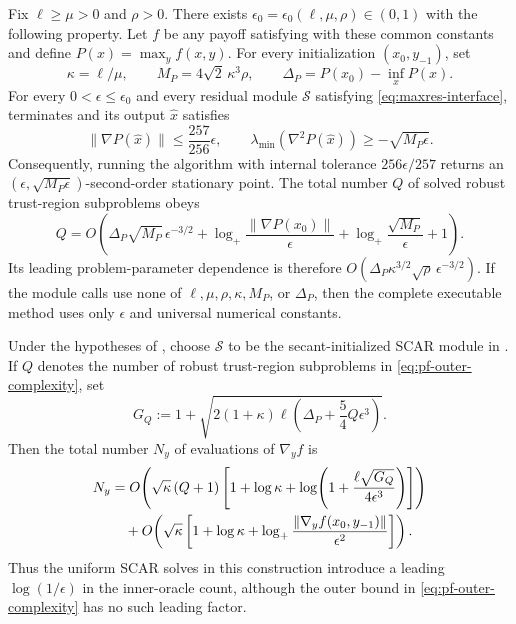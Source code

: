 \documentclass{article}
\begin{document}
\begin{theorem}
\label{thm:pf-scar-utr}
Fix $\ell\ge\mu>0$ and $\rho>0$.  There exists
$\epsilon_0=\epsilon_0(\ell,\mu,\rho)\in(0,1)$ with the following
property.  Let $f$ be any payoff satisfying  with
these common constants and define $P(x)=\max_yf(x,y)$.  For every
initialization $(x_0,y_{-1})$, set
\[
 \kappa=\ell/\mu,
 \qquad M_P=4\sqrt2\,\kappa^3\rho,
 \qquad \Delta_P=P(x_0)-\inf_xP(x).
\]
For every $0<\epsilon\le\epsilon_0$ and every residual module $\mathcal S$
satisfying \eqref{eq:maxres-interface},
 terminates and its output $\widehat x$
satisfies
\begin{equation}\label{eq:pf-return}
 \|\nabla P(\widehat x)\|\le\frac{257}{256}\epsilon,
 \qquad
 \lambda_{\min}(\nabla^2P(\widehat x))
 \ge-\sqrt{M_P\epsilon}.
\end{equation}
Consequently, running the algorithm with internal tolerance
$256\epsilon/257$ returns an
$(\epsilon,\sqrt{M_P\epsilon})$-second-order stationary point.
The total number $Q$ of solved robust trust-region subproblems obeys
\begin{equation}\label{eq:pf-outer-complexity}
 Q=O\!\left(
  \Delta_P\sqrt{M_P}\,\epsilon^{-3/2}
  +\log_+\frac{\|\nabla P(x_0)\|}{\epsilon}
  +\log_+\frac{\sqrt{M_P}}{\epsilon}+1
 \right).
\end{equation}
Its leading problem-parameter dependence is therefore
$O(\Delta_P\kappa^{3/2}\sqrt\rho\,\epsilon^{-3/2})$.
If the module calls use none of
$\ell,\mu,\rho,\kappa,M_P$, or $\Delta_P$, then the complete
executable method uses only $\epsilon$ and universal numerical
constants.
\end{theorem}

\begin{corollary}
\label{cor:pf-scar-inner-complexity}
Under the hypotheses of , choose $\mathcal S$ to
be the secant-initialized SCAR module in .  If
$Q$ denotes the number of robust trust-region subproblems in
\eqref{eq:pf-outer-complexity}, set
\begin{equation}\label{eq:pf-gradient-level}
 G_Q:=1+\sqrt{2(1+\kappa)\ell
       \left(\Delta_P+\frac54Q\epsilon^3\right)}.
\end{equation}
Then the total number $N_y$ of
evaluations of $\nabla_yf$ is
\begin{align}
 N_y
 &=O\!\left(
  \sqrt\kappa\,(Q+1)
  \left[1+\log\kappa+
   \log\!\left(1+
    \frac{\ell\sqrt{G_Q}}{4\epsilon^3}
   \right)
  \right]\right)\notag\\
 &\quad+O\!\left(
  \sqrt\kappa\left[1+\log\kappa+
   \log_+\frac{\|\nabla_yf(x_0,y_{-1})\|}{\epsilon^2}
  \right]\right).
 \label{eq:pf-inner-complexity}
\end{align}
Thus the uniform SCAR solves in this construction introduce a leading
$\log(1/\epsilon)$ in the inner-oracle count, although the outer bound
in \eqref{eq:pf-outer-complexity} has no such leading factor.
\end{corollary}
\end{document}
